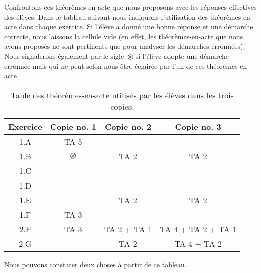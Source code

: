 \documentclass{report}
\theoremstyle{definition}
\newcommand{\tas}{théorèmes-en-acte }
\begin{document}
Confrontons ces \tas que nous proposons avec les réponses effectives des élèves. Dans le tableau suivant nous indiquons l'utilisation des \tas dans chaque exercice. Si l'élève a donné une bonne réponse et une démarche correcte, nous laissons la cellule vide (en effet, les \tas que nous avons proposés ne sont pertinents que pour analyser les démarches erronnées). Nous signalerons également par le sigle~$\otimes$ si l'élève adopte une démarche erronnée mais qui ne peut selon nous être éclairée par l'un de ces \tas.

\begin{table}[h]
\begin{center}
\begin{tabular}{|c|c|c|c|}
\hline 
Exercice & Copie no. 1 & Copie no. 2 & Copie no. 3 \\ \hline  \hline
1.A & TA 5 &  &  \\ \hline
1.B & $\otimes$ & TA 2 & TA 2 \\ \hline
1.C &  &  &   \\ \hline
1.D &  &  &  \\ \hline
1.E &  & TA 2 & TA 2 \\ \hline
1.F & TA 3 &  &  \\ \hline \hline
2.F & TA 3 & TA 2 + TA 1 & TA 4 + TA 2 + TA 1 \\ \hline
2.G &  & TA 2 & TA 4 + TA 2 \\ \hline
\end{tabular}
\caption{Table des \tas utilisés par les élèves dans les trois copies.}
\end{center}
\end{table}

Nous pouvons constater deux choses à partir de ce tableau.
\end{document}
